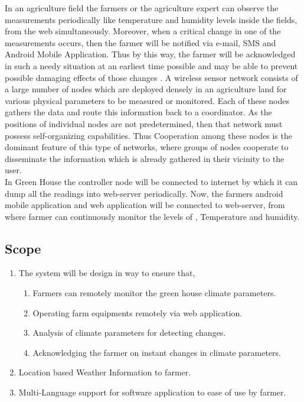 \documentclass[10pt,a4paper]{article}
\begin{document}
\quad
In an agriculture field the farmers or the agriculture expert can observe the measurements periodically like temperature and humidity levels inside the fields, from the web simultaneously. Moreover, when a critical change in one of the measurements occurs, then the farmer will be notified via e-mail, SMS and Android Mobile Application. Thus by this way, the farmer will be acknowledged in such a needy situation at an earliest time possible and may be able to prevent possible damaging effects of those changes \cite{1}. A wireless sensor network consists of a large number of nodes which are deployed densely in an agriculture land for various physical parameters to be measured or monitored. Each of these nodes gathers the data and route this information back to a coordinator. As the positions of individual nodes are not predetermined, then that network must possess self-organizing capabilities. Thus Cooperation among these nodes is the dominant feature of this type of networks, where groups of nodes cooperate to disseminate the information which is already gathered in their vicinity to the user. \\

\quad
In Green House the controller node will be connected to internet by which it can dump all the readings into web-server periodically. Now, the farmers android mobile application and web application will be connected to web-server, from where farmer can continuously monitor the levels of , Temperature and humidity. 
\begin{large}
\section{Scope}
\end{large}
\begin{enumerate}
\item The system will be design in way to ensure that,
\begin{enumerate}
\item Farmers can remotely monitor the green house climate parameters.
\item Operating farm equipments remotely via web application.
\item Analysis of climate parameters for detecting changes.
\item Acknowledging the farmer on instant changes in climate parameters.
\end{enumerate}
\item Location based Weather Information to farmer.
\item Multi-Language support for software application to ease of use by farmer. 
\end{enumerate}
\end{document}
